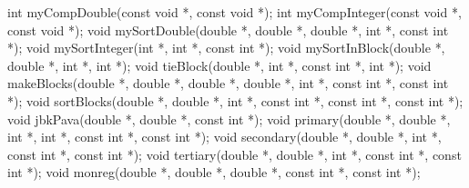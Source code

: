 \documentclass[
  12pt,
  letterpaper,
  DIV=11,
  numbers=noendperiod]{scrreprt}
\newenvironment{Shaded}{\begin{snugshade}}{\end{snugshade}}
\newcommand{\DataTypeTok}[1]{\textcolor[rgb]{0.68,0.00,0.00}{#1}}
\newcommand{\NormalTok}[1]{\textcolor[rgb]{0.00,0.23,0.31}{#1}}
\newcommand{\OperatorTok}[1]{\textcolor[rgb]{0.37,0.37,0.37}{#1}}
\theoremstyle{remark}
\begin{document}
\begin{Shaded}
\begin{Highlighting}[]
\DataTypeTok{int}\NormalTok{ myCompDouble}\OperatorTok{(}\DataTypeTok{const} \DataTypeTok{void} \OperatorTok{*,} \DataTypeTok{const} \DataTypeTok{void} \OperatorTok{*);}
\DataTypeTok{int}\NormalTok{ myCompInteger}\OperatorTok{(}\DataTypeTok{const} \DataTypeTok{void} \OperatorTok{*,} \DataTypeTok{const} \DataTypeTok{void} \OperatorTok{*);}
\DataTypeTok{void}\NormalTok{ mySortDouble}\OperatorTok{(}\DataTypeTok{double} \OperatorTok{*,} \DataTypeTok{double} \OperatorTok{*,} \DataTypeTok{double} \OperatorTok{*,} \DataTypeTok{int} \OperatorTok{*,} \DataTypeTok{const} \DataTypeTok{int} \OperatorTok{*);}
\DataTypeTok{void}\NormalTok{ mySortInteger}\OperatorTok{(}\DataTypeTok{int} \OperatorTok{*,} \DataTypeTok{int} \OperatorTok{*,} \DataTypeTok{const} \DataTypeTok{int} \OperatorTok{*);}
\DataTypeTok{void}\NormalTok{ mySortInBlock}\OperatorTok{(}\DataTypeTok{double} \OperatorTok{*,} \DataTypeTok{double} \OperatorTok{*,} \DataTypeTok{int} \OperatorTok{*,} \DataTypeTok{int} \OperatorTok{*);}
\DataTypeTok{void}\NormalTok{ tieBlock}\OperatorTok{(}\DataTypeTok{double} \OperatorTok{*,} \DataTypeTok{int} \OperatorTok{*,} \DataTypeTok{const} \DataTypeTok{int} \OperatorTok{*,} \DataTypeTok{int} \OperatorTok{*);}
\DataTypeTok{void}\NormalTok{ makeBlocks}\OperatorTok{(}\DataTypeTok{double} \OperatorTok{*,} \DataTypeTok{double} \OperatorTok{*,} \DataTypeTok{double} \OperatorTok{*,} \DataTypeTok{double} \OperatorTok{*,} \DataTypeTok{int} \OperatorTok{*,} \DataTypeTok{const} \DataTypeTok{int} \OperatorTok{*,}
                \DataTypeTok{const} \DataTypeTok{int} \OperatorTok{*);}
\DataTypeTok{void}\NormalTok{ sortBlocks}\OperatorTok{(}\DataTypeTok{double} \OperatorTok{*,} \DataTypeTok{double} \OperatorTok{*,} \DataTypeTok{int} \OperatorTok{*,} \DataTypeTok{const} \DataTypeTok{int} \OperatorTok{*,} \DataTypeTok{const} \DataTypeTok{int} \OperatorTok{*,}
                \DataTypeTok{const} \DataTypeTok{int} \OperatorTok{*);}
\DataTypeTok{void}\NormalTok{ jbkPava}\OperatorTok{(}\DataTypeTok{double} \OperatorTok{*,} \DataTypeTok{double} \OperatorTok{*,} \DataTypeTok{const} \DataTypeTok{int} \OperatorTok{*);}
\DataTypeTok{void}\NormalTok{ primary}\OperatorTok{(}\DataTypeTok{double} \OperatorTok{*,} \DataTypeTok{double} \OperatorTok{*,} \DataTypeTok{int} \OperatorTok{*,} \DataTypeTok{int} \OperatorTok{*,} \DataTypeTok{const} \DataTypeTok{int} \OperatorTok{*,} \DataTypeTok{const} \DataTypeTok{int} \OperatorTok{*);}
\DataTypeTok{void}\NormalTok{ secondary}\OperatorTok{(}\DataTypeTok{double} \OperatorTok{*,} \DataTypeTok{double} \OperatorTok{*,} \DataTypeTok{int} \OperatorTok{*,} \DataTypeTok{const} \DataTypeTok{int} \OperatorTok{*,} \DataTypeTok{const} \DataTypeTok{int} \OperatorTok{*);}
\DataTypeTok{void}\NormalTok{ tertiary}\OperatorTok{(}\DataTypeTok{double} \OperatorTok{*,} \DataTypeTok{double} \OperatorTok{*,} \DataTypeTok{int} \OperatorTok{*,} \DataTypeTok{const} \DataTypeTok{int} \OperatorTok{*,} \DataTypeTok{const} \DataTypeTok{int} \OperatorTok{*);}
\DataTypeTok{void}\NormalTok{ monreg}\OperatorTok{(}\DataTypeTok{double} \OperatorTok{*,} \DataTypeTok{double} \OperatorTok{*,} \DataTypeTok{double} \OperatorTok{*,} \DataTypeTok{const} \DataTypeTok{int} \OperatorTok{*,} \DataTypeTok{const} \DataTypeTok{int} \OperatorTok{*);}


\end{Highlighting}
\end{Shaded}
\end{document}
